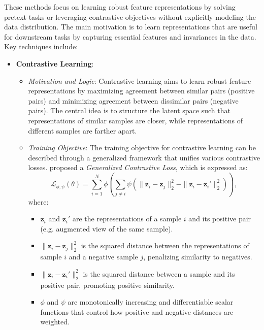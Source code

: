 These methods focus on learning robust feature representations by solving pretext tasks or leveraging contrastive objectives without explicitly modeling the data distribution. The main motivation is to learn representations that are useful for downstream tasks by capturing essential features and invariances in the data. Key techniques include:

\begin{itemize}
    \item \textbf{Contrastive Learning}:
    \begin{itemize}
        \item \emph{Motivation and Logic}: Contrastive learning aims to learn robust feature representations by maximizing agreement between similar pairs (positive pairs) and minimizing agreement between dissimilar pairs (negative pairs). The central idea is to structure the latent space such that representations of similar samples are closer, while representations of different samples are farther apart.

        \item \emph{Training Objective}: The training objective for contrastive learning can be described through a generalized framework that unifies various contrastive losses. \citet{tian2022} proposed a \textit{Generalized Contrastive Loss}, which is expressed as:
        \[
        \mathcal{L}_{\phi,\psi}(\theta) = \sum_{i=1}^{N} \phi \left( \sum_{j \neq i} \psi\left(\|\mathbf{z}_i - \mathbf{z}_j\|_2^2 - \|\mathbf{z}_i - \mathbf{z}_i'\|_2^2\right) \right),
        \]
        where:
        \begin{itemize}
            \item \(\mathbf{z}_i\) and \(\mathbf{z}_i'\) are the representations of a sample \(i\) and its positive pair (e.g. augmented view of the same sample).
            \item \(\|\mathbf{z}_i - \mathbf{z}_j\|_2^2\) is the squared distance between the representations of sample \(i\) and a negative sample \(j\), penalizing similarity to negatives.
            \item \(\|\mathbf{z}_i - \mathbf{z}_i'\|_2^2\) is the squared distance between a sample and its positive pair, promoting positive similarity.
            \item \(\phi\) and \(\psi\) are monotonically increasing and differentiable scalar functions that control how positive and negative distances are weighted.
        \end{itemize}


\end{itemize}
\end{itemize}
